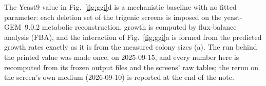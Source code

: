 \clearpage
{}

The Yeast9 value in Fig.~\ref{fig:ggi}d is a mechanistic baseline with no fitted parameter:
each deletion set of the trigenic screens is imposed on the yeast-GEM~9.0.2 metabolic
reconstruction, growth is computed by flux-balance analysis (FBA), and the interaction of
Fig.~\ref{fig:ggi}a is formed from the predicted growth rates exactly as it is from the
measured colony sizes (a). The run behind the printed value was made
once, on 2025-09-15, and every number here is recomputed from its frozen output files and
the screens' raw tables; the rerun on the screen's own medium (2026-09-10) is reported at
the end of the note.

